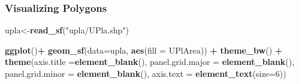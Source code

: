 \documentclass[
  shownotes,
  xcolor={svgnames},
  hyperref={colorlinks,citecolor=DarkBlue,linkcolor=DarkRed,urlcolor=DarkBlue}
   , aspectratio=169]{beamer}
\newenvironment{Shaded}{\begin{snugshade}}{\end{snugshade}}
\newcommand{\DataTypeTok}[1]{\textcolor[rgb]{0.13,0.29,0.53}{#1}}
\newcommand{\DecValTok}[1]{\textcolor[rgb]{0.00,0.00,0.81}{#1}}
\newcommand{\KeywordTok}[1]{\textcolor[rgb]{0.13,0.29,0.53}{\textbf{#1}}}
\newcommand{\NormalTok}[1]{#1}
\newcommand{\OperatorTok}[1]{\textcolor[rgb]{0.81,0.36,0.00}{\textbf{#1}}}
\newcommand{\StringTok}[1]{\textcolor[rgb]{0.31,0.60,0.02}{#1}}
\begin{document}
\begin{frame}[fragile]
\frametitle{Visualizing  Polygons}


\begin{minipage}[t]{0.52\linewidth}
        \begin{scriptsize}

\begin{Shaded}
\begin{Highlighting}[]
\NormalTok{upla\textless{}{-}}\KeywordTok{read\_sf}\NormalTok{(}\StringTok{"upla/UPla.shp"}\NormalTok{)}

\KeywordTok{ggplot}\NormalTok{()}\OperatorTok{+}
\StringTok{  }\KeywordTok{geom\_sf}\NormalTok{(}\DataTypeTok{data=}\NormalTok{upla, }\KeywordTok{aes}\NormalTok{(}\DataTypeTok{fill =}\NormalTok{ UPlArea)) }\OperatorTok{+}
\StringTok{  }\KeywordTok{theme\_bw}\NormalTok{() }\OperatorTok{+}
\StringTok{  }\KeywordTok{theme}\NormalTok{(}\DataTypeTok{axis.title =}\KeywordTok{element\_blank}\NormalTok{(),}
        \DataTypeTok{panel.grid.major =} \KeywordTok{element\_blank}\NormalTok{(),}
        \DataTypeTok{panel.grid.minor =} \KeywordTok{element\_blank}\NormalTok{(),}
        \DataTypeTok{axis.text =} \KeywordTok{element\_text}\NormalTok{(}\DataTypeTok{size=}\DecValTok{6}\NormalTok{))}
\end{Highlighting}
\end{Shaded}
  \end{scriptsize}
    \end{minipage}
    \hfill
    \begin{minipage}[t]{0.43\linewidth}%
        \begin{figure}[H] \centering
            \captionsetup{justification=centering}


\end{figure}
\end{minipage}
\end{frame}
\end{document}
